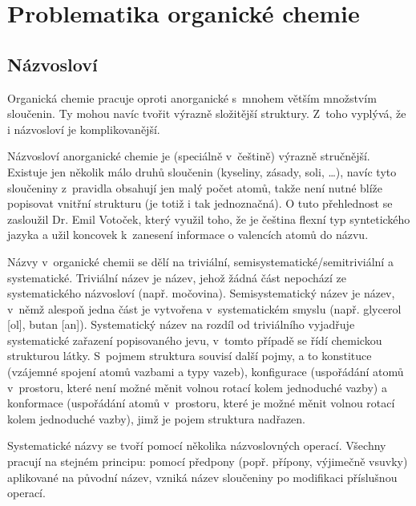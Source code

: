\chapter{Problematika organické chemie}
\section{Názvosloví}
Organická chemie pracuje oproti anorganické s~mnohem větším množstvím sloučenin.
Ty mohou navíc tvořit výrazně složitější struktury. Z~toho vyplývá, že
i názvosloví je komplikovanější.

Názvosloví anorganické chemie je (speciálně v~češtině) výrazně stručnější.
Existuje jen několik málo druhů sloučenin (kyseliny, zásady, soli, \dots), navíc
tyto sloučeniny z~pravidla obsahují jen malý počet atomů, takže není nutné blíže
popisovat vnitřní strukturu (je totiž i tak jednoznačná). O tuto pře\-hled\-nost se
zasloužil Dr. Emil Votoček, který využil toho, že je čeština flexní typ
syntetického jazyka a užil koncovek k~zanesení informace o valencích atomů do
názvu.

Názvy v~organické chemii se dělí na triviální, semisystematické/se\-mi\-tri\-vi\-ál\-ní
a systematické. Triviální název je název, jehož žádná část nepochází ze
systematického názvosloví (např. močovina). Semisystematický název je název,
v~němž alespoň jedna část je vytvořena v~systematickém smyslu (např. glycerol [ol],
butan [an]). Systematický název na rozdíl od triviálního vyjadřuje systematické
zařazení popisovaného jevu, v~tomto případě se řídí chemickou strukturou látky.
S~pojmem struktura souvisí další pojmy, a to konstituce (vzájemné spojení atomů
vazbami a typy vazeb), konfigurace (uspořádání atomů v~prostoru, které není
možné měnit volnou rotací kolem jednoduché vazby) a konformace (uspořádání atomů
v~prostoru, které je možné měnit volnou rotací kolem jednoduché vazby), jimž je
pojem struktura nadřazen\cite{Kolar:organa}.

Systematické názvy se tvoří pomocí několika názvoslovných operací. Vše\-chny
pracují na stejném principu: pomocí předpony (popř. přípony, vý\-ji\-me\-č\-ně vsuvky)
aplikované na původní název, vzniká název sloučeniny po modifikaci příslušnou
operací.

